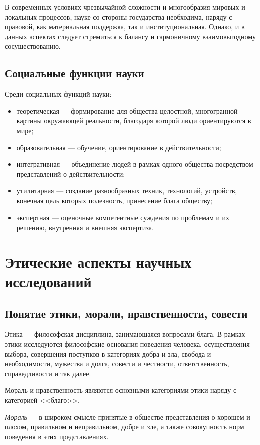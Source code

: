 В современных условиях чрезвычайной сложности и
многообразия мировых и локальных процессов, науке со стороны государства
необходима, наряду с правовой, как материальная поддержка, так и
институциональная. Однако, и в данных аспектах следует стремиться к балансу и гармоничному
взаимовыгодному сосуществованию.

\subsection{Социальные функции науки}

Среди социальных функций науки:
\begin{itemize}
    \item теоретическая --- формирование для общества целостной, многогранной картины
    окружающей реальности, благодаря которой люди ориентируются в мире;
    \item образовательная --- обучение, ориентирование в действительности;
    \item интегративная --- объединение людей в рамках одного общества посредством
    представлений о действительности;
    \item утилитарная --- создание разнообразных техник, технологий, устройств, конечная цель которых полезность, принесение блага обществу;
    \item экспертная --- оценочные компетентные суждения по проблемам и их решению,  внутренняя и внешняя экспертиза.
\end{itemize}

\section{Этические аспекты научных исследований}

\subsection{Понятие этики, морали, нравственности, совести} 

Этика --- философская дисциплина, занимающаяся вопросами блага. В рамках этики
исследуются философские основания поведения человека, осуществления выбора,
совершения поступков в категориях добра и зла, свобода и необходимости, мужества
и долга, совести и честности, ответственность, справедливости и так далее. 

Мораль и нравственность являются основными категориями этики наряду с категорией <<благо>>.

\textit{Мораль} --- в широком смысле принятые в обществе представления о хорошем и
плохом, правильном и неправильном, добре и зле, а также совокупность норм
поведения в этих представлениях. 

